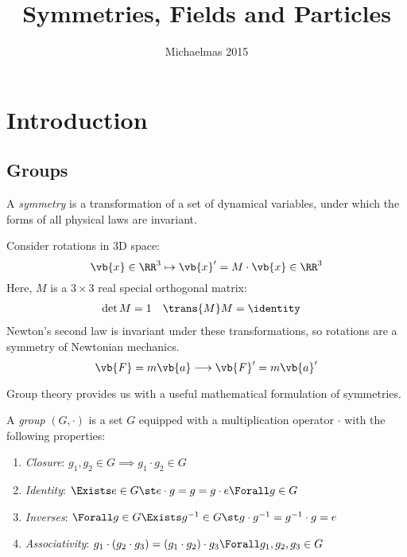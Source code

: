 \documentclass{jknotes}
\begin{document}
\title{Symmetries, Fields and Particles}
\date{Michaelmas 2015}

\maketitle
\suggestionsspiel
\unlecturedspiel

\tableofcontents

\section{Introduction}

\subsection{Groups}

\begin{defn}
    A \emph{symmetry} is a transformation of a set of dynamical variables, under which the forms of all physical laws are invariant.
\end{defn}

\begin{eg}
    Consider rotations in 3D space: 
    \begin{equation}
        \vb{x} \in \RR^3 \mapsto \vb{x}' = M \cdot \vb{x} \in \RR^3
    \end{equation}
    Here, \(M\) is a \(3\times3\) real special orthogonal matrix:
    \begin{align}
        \det M &= 1 & \trans{M}M &= \identity
    \end{align}
    Newton's second law is invariant under these transformations, so rotations are a symmetry of Newtonian mechanics.
    \begin{equation}
        \vb{F} = m \vb{a} \longrightarrow \vb{F}' = m \vb{a}'
        \label{}
    \end{equation}
\end{eg}

Group theory provides us with a useful mathematical formulation of symmetries.

\begin{defn}
    A \emph{group} \((G,\cdot)\) is a set \(G\) equipped with a multiplication operator \(\cdot\) with the following properties:
    \begin{enumerate}[label=(\roman*)]
        \item \emph{Closure}: \(g_1,g_2 \in G \implies g_1\cdot g_2 \in G\)
        \item \emph{Identity}: \(\Exists e \in G \st e\cdot g = g = g\cdot e \Forall g \in G\)
        \item \emph{Inverses}: \(\Forall g \in G \Exists g^{-1} \in G \st g\cdot g^{-1} = g^{-1}\cdot g = e\)
        \item \emph{Associativity}: \(g_1\cdot (g_2\cdot g_3) = (g_1\cdot g_2)\cdot g_3 \Forall g_1, g_2, g_3 \in G\)
    \end{enumerate}
\end{defn}
\end{document}
